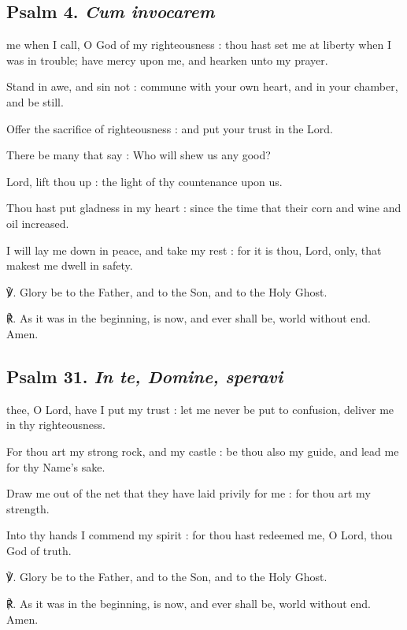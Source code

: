 \begin{multicols}{2}
\subsection{Psalm 4. \textit{Cum invocarem}}
 me when I call, O God of my righteousness : thou hast set me at liberty when I was in trouble; have mercy upon me, and hearken unto my prayer.\par
{}
Stand in awe, and sin not : commune with your own heart, and in your chamber, and be still.\par
{}Offer the sacrifice of righteousness : and put your trust in the Lord.\par
{}There be many that say : Who will shew us any good?\par
{}Lord, lift thou up : the light of thy countenance upon us.\par
{}Thou hast put gladness in my heart : since the time that their corn and wine and oil increased.\par
{}I will lay me down in peace, and take my rest : for it is thou, Lord, only, that makest me dwell in safety.\par
℣. Glory be to the Father, and to the Son, and to the Holy Ghost.\par
℟. As it was in the beginning, is now, and ever shall be, world without end. Amen.

\subsection{Psalm 31. \textit{In te, Domine, speravi}}
 thee, O Lord, have I put my trust : let me never be put to confusion, deliver me in thy righteousness.\par
{}
For thou art my strong rock, and my castle : be thou also my guide, and lead me for thy Name's sake.\par
{}Draw me out of the net that they have laid privily for me : for thou art my strength.\par
{}Into thy hands I commend my spirit : for thou hast redeemed me, O Lord, thou God of truth.\par
℣. Glory be to the Father, and to the Son, and to the Holy Ghost.\par
℟. As it was in the beginning, is now, and ever shall be, world without end. Amen.


\end{multicols}
